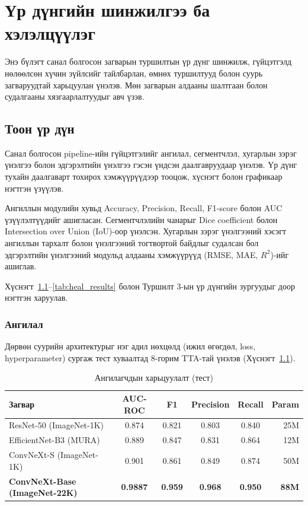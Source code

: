 
\chapter{Үр дүнгийн шинжилгээ ба хэлэлцүүлэг}
\label{Chapter6}
\pagecolor{Beige}

Энэ бүлэгт санал болгосон загварын туршилтын үр дүнг шинжилж, гүйцэтгэлд нөлөөлсөн хүчин зүйлсийг тайлбарлан, өмнөх туршилтууд болон суурь загваруудтай харьцуулан үнэлэв. Мөн загварын алдааны шалтгаан болон судалгааны хязгаарлалтуудыг авч үзэв.

\section{Тоон үр дүн}

Санал болгосон pipeline-ийн гүйцэтгэлийг ангилал, сегментчлэл, хугарлын зэрэг үнэлгээ болон эдгэрэлтийн үнэлгээ гэсэн үндсэн даалгавруудаар үнэлэв. Үр дүнг тухайн даалгаварт тохирох хэмжүүрүүдээр тооцож, хүснэгт болон графикаар нэгтгэн үзүүлэв.

Ангиллын модулийн хувьд Accuracy, Precision, Recall, F1-score болон AUC үзүүлэлтүүдийг ашигласан. Сегментчлэлийн чанарыг Dice coefficient болон Intersection over Union (IoU)-оор үнэлсэн. Хугарлын зэрэг үнэлгээний хэсэгт ангиллын тархалт болон үнэлгээний тогтвортой байдлыг судалсан бол эдгэрэлтийн үнэлгээний модульд алдааны хэмжүүрүүд (RMSE, MAE, $R^2$)-ийг ашиглав.

Хүснэгт~\ref{tab:cls_results}--\ref{tab:heal_results} болон Туршилт 3-ын үр дүнгийн зургуудыг доор нэгтгэн харуулав.

\subsection*{Ангилал}

Дөрвөн суурийн архитектурыг нэг адил нөхцөлд (ижил өгөгдөл, loss, hyperparameter) сургаж тест хуваалтад 8-горим TTA-тай үнэлэв (Хүснэгт~\ref{tab:cls_results}).

\begin{table}[!htbp]
    \centering
    \begin{tabular}{l c c c c r}
    \toprule
    \textbf{Загвар} & \textbf{AUC-ROC} & \textbf{F1} & \textbf{Precision} & \textbf{Recall} & \textbf{Param} \\
    \midrule
    ResNet-50 (ImageNet-1K)              & 0.874 & 0.821 & 0.803 & 0.840 & 25M \\[4pt]
    EfficientNet-B3 (MURA)               & 0.889 & 0.847 & 0.831 & 0.864 & 12M \\[4pt]
    ConvNeXt-S (ImageNet-1K)             & 0.901 & 0.861 & 0.849 & 0.874 & 50M \\[4pt]
    \textbf{ConvNeXt-Base (ImageNet-22K)} & \textbf{0.9887} & \textbf{0.959} & \textbf{0.968} & \textbf{0.950} & \textbf{88M} \\
    \bottomrule
    \end{tabular}
    \caption{Ангилагчдын харьцуулалт (тест)}
    \label{tab:cls_results}
\end{table}

